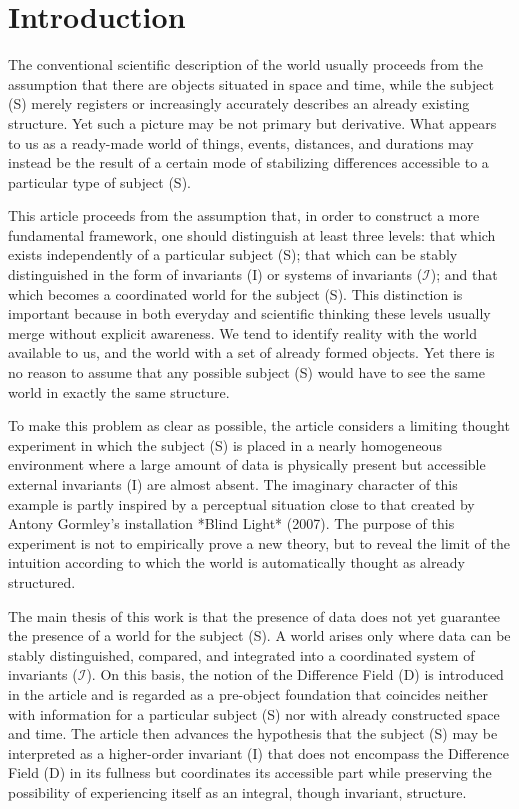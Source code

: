 \documentclass[aps,prd,onecolumn,nofootinbib,superscriptaddress]{revtex4-2} %
\begin{document}
    \section{Introduction}
    The conventional scientific description of the world usually proceeds from the assumption that there are objects situated in space and time, while the subject (S) merely registers or increasingly accurately describes an already existing structure. Yet such a picture may be not primary but derivative. What appears to us as a ready-made world of things, events, distances, and durations may instead be the result of a certain mode of stabilizing differences accessible to a particular type of subject (S).

    This article proceeds from the assumption that, in order to construct a more fundamental framework, one should distinguish at least three levels: that which exists independently of a particular subject (S); that which can be stably distinguished in the form of invariants (I) or systems of invariants ($\mathcal{I}$); and that which becomes a coordinated world for the subject (S). This distinction is important because in both everyday and scientific thinking these levels usually merge without explicit awareness. We tend to identify reality with the world available to us, and the world with a set of already formed objects. Yet there is no reason to assume that any possible subject (S) would have to see the same world in exactly the same structure.

    To make this problem as clear as possible, the article considers a limiting thought experiment in which the subject (S) is placed in a nearly homogeneous environment where a large amount of data is physically present but accessible external invariants (I) are almost absent. The imaginary character of this example is partly inspired by a perceptual situation close to that created by Antony Gormley’s installation *Blind Light* (2007). The purpose of this experiment is not to empirically prove a new theory, but to reveal the limit of the intuition according to which the world is automatically thought as already structured.

    The main thesis of this work is that the presence of data does not yet guarantee the presence of a world for the subject (S). A world arises only where data can be stably distinguished, compared, and integrated into a coordinated system of invariants ($\mathcal{I}$). On this basis, the notion of the Difference Field (D) is introduced in the article and is regarded as a pre-object foundation that coincides neither with information for a particular subject (S) nor with already constructed space and time. The article then advances the hypothesis that the subject (S) may be interpreted as a higher-order invariant (I) that does not encompass the Difference Field (D) in its fullness but coordinates its accessible part while preserving the possibility of experiencing itself as an integral, though invariant, structure.
\end{document}
